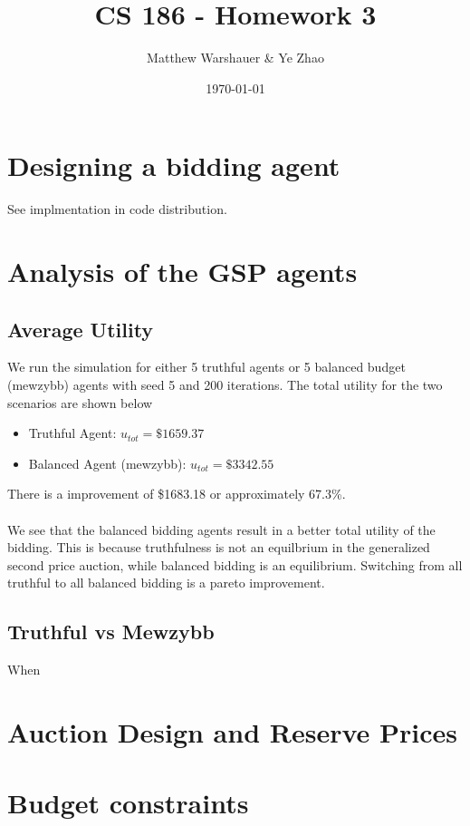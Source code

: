 \documentclass[11pt]{article}
\title{\bf CS 186 - Homework 3}
\date{\today}
\author{Matthew Warshauer \& Ye Zhao}
\begin{document}
\maketitle
\section{Designing a bidding agent}
See implmentation in code distribution.
\section{Analysis of the GSP agents}
\subsection{Average Utility}
We run the simulation for either 5 truthful agents or 5 balanced budget (mewzybb) agents with seed 5 and 200 iterations. The total utility for the two scenarios are shown below
\begin{itemize}
\item Truthful Agent: $u_{tot}=\$1659.37$
\item Balanced Agent (mewzybb): $u_{tot}=\$3342.55$
\end{itemize}
There is a improvement of \$1683.18 or approximately 67.3\%.
\\
\\
We see that the balanced bidding agents result in a better total utility of the bidding. This is because truthfulness is not an equilbrium in the generalized second price auction, while balanced bidding is an equilibrium. Switching from all truthful to all balanced bidding is a pareto improvement.
\subsection{Truthful vs Mewzybb}
When
\section{Auction Design and Reserve Prices}
\section{Budget constraints}
\end{document}
